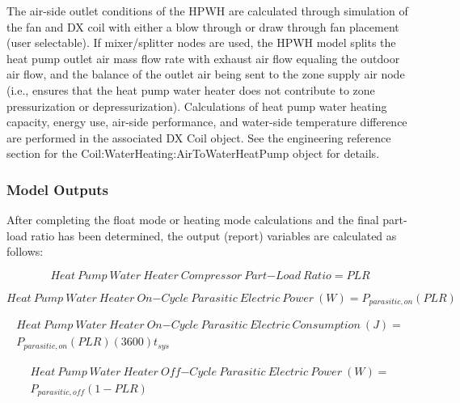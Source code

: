 The air-side outlet conditions of the HPWH are calculated through simulation of the fan and DX coil with either a blow through or draw through fan placement (user selectable). If mixer/splitter nodes are used, the HPWH model splits the heat pump outlet air mass flow rate with exhaust air flow equaling the outdoor air flow, and the balance of the outlet air being sent to the zone supply air node (i.e., ensures that the heat pump water heater does not contribute to zone pressurization or depressurization). Calculations of heat pump water heating capacity, energy use, air-side performance, and water-side temperature difference are performed in the associated DX Coil object. See the engineering reference section for the Coil:WaterHeating:AirToWaterHeatPump object for details.

\subsubsection{Model Outputs}\label{model-outputs-000}

After completing the float mode or heating mode calculations and the final part-load ratio has been determined, the output (report) variables are calculated as follows:

\begin{equation}
Heat~Pump~Water~Heater~Compressor~Part{\mathrm{ - }}Load~Ratio = PLR
\end{equation}

\begin{equation}
Heat~Pump~Water~Heater~On{\mathrm{ - }}Cycle~Parasitic~Electric~Power~(W) = {P_{parasitic,on}}\left( {PLR} \right)
\end{equation}

\begin{equation}
\begin{split}
Heat~Pump~Water~Heater~On{\mathrm{ - }}Cycle~Parasitic~Electric~Consumption~(J) = \\{P_{parasitic,on}}\left( {PLR} \right)\left( {3600} \right){t_{sys}}
\end{split}
\end{equation}

\begin{equation}
\begin{split}
Heat~Pump~Water~Heater~Off{\mathrm{ - }}Cycle~Parasitic~Electric~Power~(W) = \\{P_{parasitic,off}}\left( {1 - PLR} \right)
\end{split}
\end{equation}

